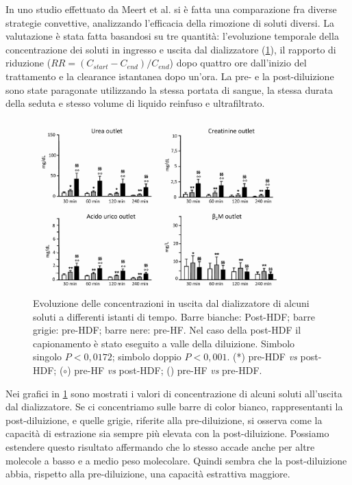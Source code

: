 In uno studio effettuato da Meert et al. \cite{bib:meert} si è fatta una comparazione fra diverse strategie convettive, analizzando l'efficacia della rimozione di soluti diversi. La valutazione è stata fatta basandosi su tre quantità: l'evoluzione temporale della concentrazione dei soluti in ingresso e uscita dal dializzatore (\figurename\ref{prevspost}), il rapporto di riduzione ($RR=(C_{start}-C_{end})/C_{end}$) dopo quattro ore dall'inizio del trattamento e la clearance istantanea dopo un'ora. La pre- e la post-diluizione sono state paragonate utilizzando la stessa portata di sangue, la stessa durata della seduta e stesso volume di liquido reinfuso e ultrafiltrato.
\begin{figure}[!htb]
	\centering
		\includegraphics[width=0.9\textwidth]{immagini/prevspost_NIC.eps}
		\caption{Evoluzione delle concentrazioni in uscita dal dializzatore di alcuni soluti a differenti istanti di tempo. Barre bianche: Post-HDF; barre grigie: pre-HDF; barre nere: pre-HF. Nel caso della post-HDF il capionamento è stato eseguito a valle della diluizione. Simbolo singolo $P<0,0172$; simbolo doppio $P<0,001$. (*) pre-HDF \textit{vs} post-HDF; ($\circ$) pre-HF \textit{vs} post-HDF; (\textsection) pre-HF \textit{vs} pre-HDF.}\label{prevspost}
\end{figure}
Nei grafici in \figurename\ref{prevspost} sono mostrati i valori di concentrazione di alcuni soluti all'uscita dal dializzatore. Se ci concentriamo sulle barre di color bianco, rappresentanti la post-diluizione, e quelle grigie, riferite alla pre-diluizione, si osserva come la capacità di estrazione sia sempre più elevata con la post-diluizione. Possiamo estendere questo risultato affermando che lo stesso accade anche per altre molecole a basso e a medio peso molecolare. Quindi sembra che la post-diluizione abbia, rispetto alla pre-diluizione, una capacità estrattiva maggiore.

